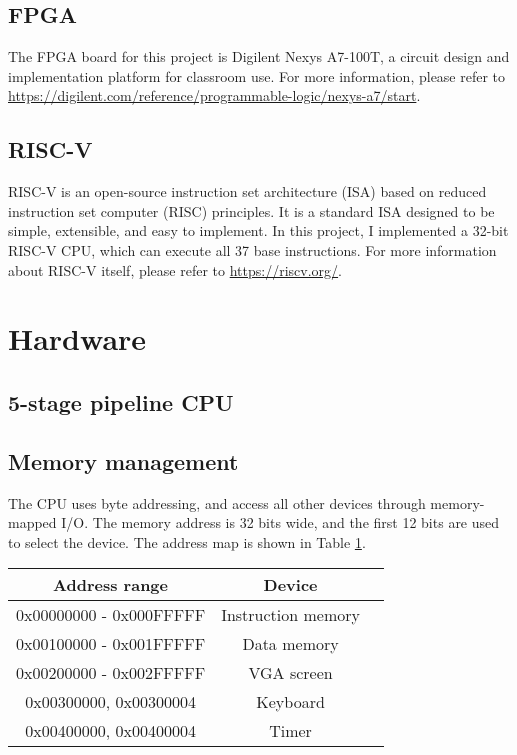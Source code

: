 \documentclass[12pt, a4paper, oneside]{article}
\begin{document}
\subsection{FPGA}
The FPGA board for this project is Digilent Nexys A7-100T, a circuit design and implementation platform for classroom use. For more information, please refer to \url{https://digilent.com/reference/programmable-logic/nexys-a7/start}.

\subsection{RISC-V}
RISC-V is an open-source instruction set architecture (ISA) based on reduced instruction set computer (RISC) principles. It is a standard ISA designed to be simple, extensible, and easy to implement. In this project, I implemented a 32-bit RISC-V CPU, which can execute all 37 base instructions. For more information about RISC-V itself, please refer to \url{https://riscv.org/}.
\section{Hardware}

\subsection{5-stage pipeline CPU}

\subsection{Memory management}

The CPU uses byte addressing, and access all other devices through memory-mapped I/O. The memory address is 32 bits wide, and the first 12 bits are used to select the device. The address map is shown in Table \ref{tab:address-map}.
\begin{table}[h]
    \centering
    \begin{tabular}{|c|c|c|}
        \hline
        Address range           & Device             \\
        \hline
        0x00000000 - 0x000FFFFF & Instruction memory \\
        \hline
        0x00100000 - 0x001FFFFF & Data memory        \\
        \hline
        0x00200000 - 0x002FFFFF & VGA screen         \\
        \hline
        0x00300000, 0x00300004  & Keyboard           \\
        \hline
        0x00400000, 0x00400004  & Timer              \\
        \hline
    \end{tabular}
    \label{tab:address-map}
\end{table}
\end{document}
